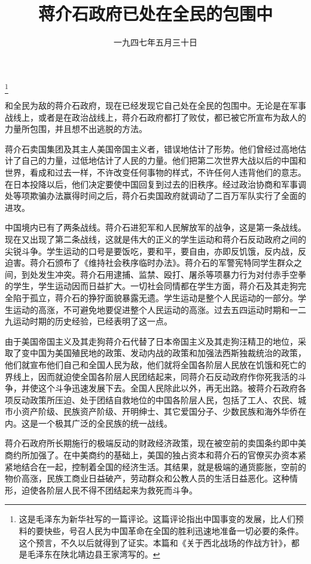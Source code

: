 
\title{蒋介石政府已处在全民的包围中}
\date{一九四七年五月三十日}
\thanks{这是毛泽东为新华社写的一篇评论。这篇评论指出中国事变的发展，比人们预料的要快些，号召人民为中国革命在全国的胜利迅速地准备一切必要的条件。这个预言，不久以后就得到了证实。本篇和《关于西北战场的作战方针》，都是毛泽东在陕北靖边县王家湾写的。}
\maketitle


和全民为敌的蒋介石政府，现在已经发现它自己处在全民的包围中。无论是在军事战线上，或者是在政治战线上，蒋介石政府都打了败仗，都已被它所宣布为敌人的力量所包围，并且想不出逃脱的方法。

蒋介石卖国集团及其主人美国帝国主义者，错误地估计了形势。他们曾经过高地估计了自己的力量，过低地估计了人民的力量。他们把第二次世界大战以后的中国和世界，看成和过去一样，不许改变任何事物的样式，不许任何人违背他们的意志。在日本投降以后，他们决定要使中国回复到过去的旧秩序。经过政治协商和军事调处等项欺骗办法赢得时间之后，蒋介石卖国政府就调动了二百万军队实行了全面的进攻。

中国境内已有了两条战线。蒋介石进犯军和人民解放军的战争，这是第一条战线。现在又出现了第二条战线，这就是伟大的正义的学生运动和蒋介石反动政府之间的尖锐斗争。学生运动的口号是要饭吃，要和平，要自由，亦即反饥饿，反内战，反迫害。蒋介石颁布了《维持社会秩序临时办法》。蒋介石的军警宪特同学生群众之间，到处发生冲突。蒋介石用逮捕、监禁、殴打、屠杀等项暴力行为对付赤手空拳的学生，学生运动因而日益扩大。一切社会同情都在学生方面，蒋介石及其走狗完全陷于孤立，蒋介石的狰狞面貌暴露无遗。学生运动是整个人民运动的一部分。学生运动的高涨，不可避免地要促进整个人民运动的高涨。过去五四运动时期和一二九运动时期的历史经验，已经表明了这一点。

由于美国帝国主义及其走狗蒋介石代替了日本帝国主义及其走狗汪精卫的地位，采取了变中国为美国殖民地的政策、发动内战的政策和加强法西斯独裁统治的政策，他们就宣布他们自己和全国人民为敌，他们就将全国各阶层人民放在饥饿和死亡的界线上，因而就迫使全国各阶层人民团结起来，同蒋介石反动政府作你死我活的斗争，并使这个斗争迅速发展下去。全国人民除此以外，再无出路。被蒋介石政府各项反动政策所压迫、处于团结自救地位的中国各阶层人民，包括了工人、农民、城市小资产阶级、民族资产阶级、开明绅士、其它爱国分子、少数民族和海外华侨在内。这是一个极其广泛的全民族的统一战线。

蒋介石政府所长期施行的极端反动的财政经济政策，现在被空前的卖国条约即中美商约所加强了。在中美商约的基础上，美国的独占资本和蒋介石的官僚买办资本紧紧地结合在一起，控制着全国的经济生活。其结果，就是极端的通货膨胀，空前的物价高涨，民族工商业日益破产，劳动群众和公教人员的生活日益恶化。这种情形，迫使各阶层人民不得不团结起来为救死而斗争。

